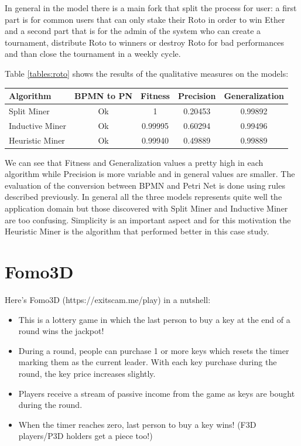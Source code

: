 In general in the model there is a main fork that split the process for user: a first part is for common users that can only 
stake their Roto in order to win Ether and a second part that is for the admin of the system who can create a tournament, 
distribute Roto to winners or destroy Roto for bad performances and than close the tournament in a weekly cycle.

Table \ref{tables:roto} shows the results of the qualitative measures on the models:

\begin{center}
    \label{tables:roto}
    \begin{tabular}{ | l | c | c | c | c |}
        \hline
        \textbf{Algorithm} & \textbf{BPMN to PN} & \textbf{Fitness} & \textbf{Precision} & \textbf{Generalization} \\ 
        \hline
        Split Miner & Ok & 1 & 0.20453 & 0.99892 \\ 
        \hline
        Inductive Miner & Ok & 0.99995 & 0.60294 & 0.99496 \\
        \hline
        Heuristic Miner & Ok & 0.99940 & 0.49889 & 0.99889 \\
        \hline
    \end{tabular}
\end{center}

We can see that Fitness and Generalization values a pretty high in each algorithm while Precision is more variable and in 
general values are smaller. The evaluation of the conversion between BPMN and Petri Net is done using rules described 
previously. In general all the three models represents quite well the application domain but those discovered with Split Miner 
and Inductive Miner are too confusing. Simplicity is an important aspect and for this motivation the Heuristic Miner is the 
algorithm that performed better in this case study.


\section{Fomo3D}
\label{case_studies:fomo}

Here's Fomo3D (https://exitscam.me/play) in a nutshell:

\begin{itemize}
    \item This is a lottery game in which the last person to buy a key at the end of a round wins the jackpot!
    \item During a round, people can purchase 1 or more keys which resets the timer marking them as the current leader. With each key purchase during the round, the key price increases slightly.
    \item Players receive a stream of passive income from the game as keys are bought during the round.
    \item When the timer reaches zero, last person to buy a key wins! (F3D players/P3D holders get a piece too!)    
\end{itemize}

